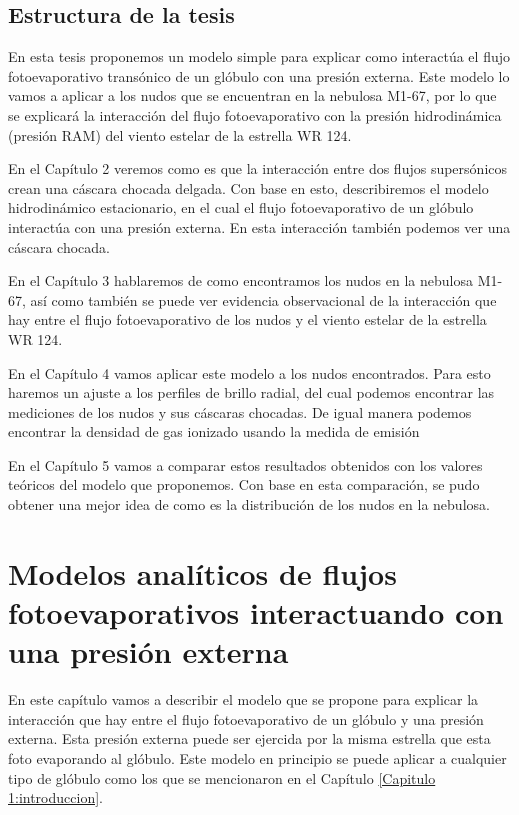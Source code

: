 \documentclass{book}
\begin{document}
\section{Estructura de la tesis}

En esta tesis proponemos un modelo simple para explicar como interactúa el flujo fotoevaporativo transónico de un glóbulo con una presión externa. Este modelo lo vamos a aplicar  a los nudos que se encuentran en la nebulosa M1-67, por lo que se explicará la interacción del flujo fotoevaporativo con la presión hidrodinámica (presión RAM) del viento estelar de la estrella WR 124.

En el Capítulo 2 veremos como es que la interacción entre dos flujos supersónicos crean una cáscara chocada delgada. Con base en esto, describiremos el modelo hidrodinámico estacionario, en el cual el flujo fotoevaporativo de un glóbulo interactúa con una presión externa. En esta interacción también podemos ver una cáscara chocada.

En el Capítulo 3 hablaremos de como encontramos los nudos en la nebulosa M1-67, así como también se puede ver evidencia observacional de la interacción que hay entre el flujo fotoevaporativo de los nudos y el viento estelar de la estrella WR 124.

En el Capítulo 4 vamos aplicar este modelo a los nudos encontrados. Para esto haremos un ajuste a los perfiles de brillo radial, del cual podemos encontrar las mediciones de los nudos y sus cáscaras chocadas. De igual manera podemos encontrar la densidad de gas ionizado usando la medida de emisión

En el Capítulo 5 vamos a comparar estos resultados obtenidos con los valores teóricos del modelo que proponemos. Con base en esta comparación, se pudo obtener una mejor idea de como es la distribución de los nudos en la nebulosa.  

\chapter{Modelos analíticos de flujos fotoevaporativos interactuando con una presión externa}
\label{Chapter : Modelo}

En este capítulo vamos a describir el modelo que se propone para explicar la interacción que hay entre el flujo fotoevaporativo de un glóbulo y una presión externa. Esta presión externa puede ser ejercida por la misma estrella que esta foto evaporando al glóbulo. Este modelo en principio se puede aplicar a cualquier tipo de glóbulo como los que se mencionaron en el Capítulo \ref{Capitulo 1:introduccion}. 
\end{document}
